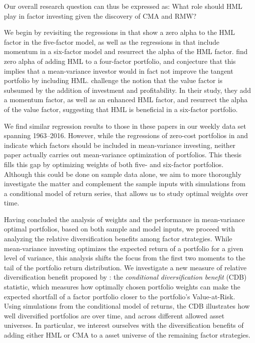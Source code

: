 Our overall research question can thus be expressed as: What role should HML play in factor investing given the discovery of CMA and RMW?

We begin by revisiting the regressions in \textcite{FF2015} that show a zero alpha to the HML factor in the five-factor model, as well as the regressions in \textcite{Asness2015} that include momentum in a six-factor model and resurrect the alpha of the HML factor. \textcite{FF2015} find zero alpha of adding HML to a four-factor portfolio, and conjecture that this implies that a mean-variance investor would in fact not improve the tangent portfolio by including HML. \textcite{Asness2015} challenge the notion that the value factor is subsumed by the addition of investment and profitability. In their study, they add a momentum factor, as well as an enhanced HML factor, and resurrect the alpha of the value factor, suggesting that HML is beneficial in a six-factor portfolio.

We find similar regression results to those in these papers in our weekly data set spanning 1963--2016. However, while the regressions of zero-cost portfolios in \textcite{FF2015} and \textcite{Asness2015} indicate which factors should be included in mean-variance investing, neither paper actually carries out mean-variance optimization of portfolios. This thesis fills this gap by optimizing weights of both five- and six-factor portfolios. Although this could be done on sample data alone, we aim to more thoroughly investigate the matter and complement the sample inputs with simulations from a conditional model of return series, that allows us to study optimal weights over time.

Having concluded the analysis of weights and the performance in mean-variance optimal portfolios, based on both sample and model inputs, we proceed with analyzing the relative diversification benefits among factor strategies. While mean-variance investing optimizes the expected return of a portfolio for a given level of variance, this analysis shifts the focus from the first two moments to the tail of the portfolio return distribution. We investigate a new measure of relative diversification benefit proposed by \textcite{ChristoffersenErrunzaJacobLanglois2012}: the \emph{conditional diversification benefit} (CDB) statistic, which measures how optimally chosen portfolio weights can make the expected shortfall of a factor portfolio closer to the portfolio's Value-at-Risk. Using simulations from the conditional model of returns, the CDB illustrates how well diversified portfolios are over time, and across different allowed asset universes. In particular, we interest ourselves with the diversification benefits of adding either HML or CMA to a asset universe of the remaining factor strategies.

